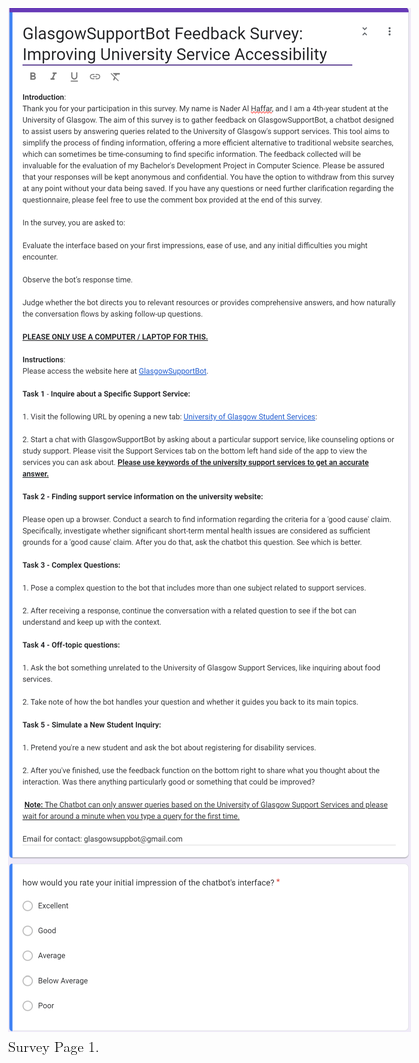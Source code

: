 \documentclass{l4proj}
\begin{document}
\begin{appendices}
\begin{figure}[h!]
  \centering
  \begin{adjustbox}{center,max height=0.77\textheight, max width=\linewidth}
    \includegraphics{images/survey1.png}
  \end{adjustbox}
  \caption{Survey Page 1.}
  \label{fig: Survey Page 1}
\end{figure}


\end{appendices}
\end{document}
